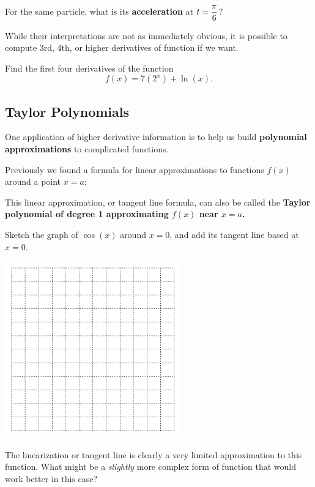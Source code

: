 \vfill

For the same particle, what is its {\bf acceleration} at
$\displaystyle t=\frac{\pi}{6}$?

\vfill

\newpage



While their interpretations are not as immediately obvious, it is
possible to compute 3rd, 4th, or higher derivatives of function if we
want.

\problem Find the first four derivatives of the function
$$f(x) = 7 (2^x) + \ln(x).$$


\newpage
{}
\subsection*{Taylor Polynomials}

One application of higher derivative information is to help us build
{\bf polynomial approximations} to complicated functions.

Previously we found a formula for linear approximations to functions
$f(x)$ around a point $x=a$:

\vspace{1.5in}

This linear approximation, or tangent line formula, can also be called
the {\bf Taylor polynomial of degree 1 approximating $f(x)$ near
  $x=a$.}

\newpage

\problem Sketch the graph of $\cos(x)$ around $x=0$, and add its
tangent line based at $x=0$.

\includegraphics[width=3in]{graphics/empty_graph_square_12}


The linearization or tangent line is clearly a very
  limited approximation to this function.  What might be a {\em
    slightly} more complex form of function that would work better in
  this case?

